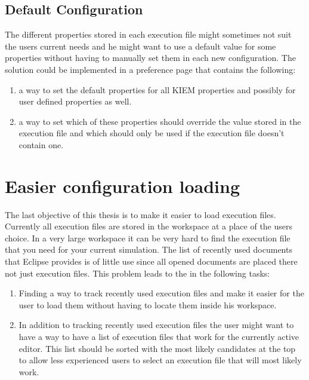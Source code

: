 \subsection{Default Configuration}
The different properties stored in each execution file might sometimes not suit the users current needs
and he might want to use a default value for some properties without having to manually set them
in each new configuration.
The solution could be implemented in a preference page that contains the following:
\begin{enumerate}
 \item a way to set the default properties for all \ac{KIEM} properties and possibly for user defined properties as well.
 \item a way to set which of these properties should override the value stored in the execution file and which
should only be used if the execution file doesn't contain one.
\end{enumerate}


\section{Easier configuration loading}
The last objective of this thesis is to make it easier to load execution files.
Currently all execution files are stored in the workspace at a place of the users choice. In a very
large workspace it can be very hard to find the execution file that you need for your current
simulation. The list of recently used documents that Eclipse provides is of little use since all
opened documents are placed there not just execution files.
This problem leads to the in the following tasks:
\begin{enumerate}
 \item Finding a way to track recently used execution files and make it easier for the user to
load them without having to locate them inside his workspace.
 \item In addition to tracking recently used execution files the user might want to have a way to have a list
of execution files that work for the currently active editor. This list should be sorted with the most likely
candidates at the top to allow less experienced users to select an execution file that will most likely work.
\end{enumerate}


